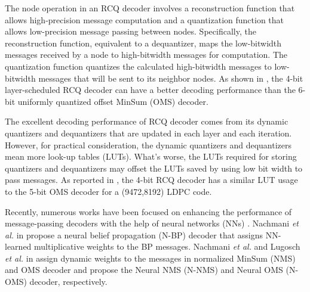 \documentclass [PhD] {uclathes}
\begin{document}
The node operation in an RCQ decoder involves a reconstruction function that allows high-precision message computation and a quantization function that allows low-precision message passing between nodes. Specifically, the reconstruction function, equivalent to a dequantizer,  maps the low-bitwidth messages received by a node to  high-bitwidth messages for computation. The quantization function quantizes the calculated high-bitwidth messages to low-bitwidth messages that will be sent to its neighbor nodes. 
 As shown in \cite{terrill2021fpga}, the 4-bit  layer-scheduled RCQ decoder can have a better decoding performance than the 6-bit uniformly quantized offset MinSum (OMS) decoder. 

 The excellent decoding performance of RCQ decoder comes from its dynamic quantizers and dequantizers that are updated in each layer and each iteration. However, for practical consideration, the dynamic quantizers and dequantizers mean more look-up tables (LUTs). What's worse, the LUTs required for storing quantizers and dequantizers may offset the LUTs saved by using low bit width to pass messages.  As reported in \cite{wang2022TCOMRCQ}, the 4-bit RCQ decoder has a similar LUT usage to the 5-bit OMS decoder for a (9472,8192) LDPC code. 

Recently, numerous works have been focused on enhancing the performance of message-passing decoders with the help of neural networks (NNs) \cite{Nachmani2016-bs,Lugosch2017-ed,Nachmani2017-qq,Nachmani2018-ra,Liang2018-lw,Wu2018-zr,Lugosch2018-gu,Lyu2018-nz,Xiao2019-kj,Deng2019-cf,Abotabl2019-wt,Buchberger2020-pf,Wang2020-fb,Lian2019-jh,nguyen2021neural}. 
Nachmani \textit{et al.} in \cite{Nachmani2016-bs} propose a  neural belief propagation (N-BP) decoder that assigns NN-learned multiplicative weights to the BP messages.
Nachmani \textit{et al.} and Lugosch \textit{et al.} in \cite{Nachmani2018-ra, Lugosch2017-ed,Nachmani2016-bs} assign dynamic weights to the messages in  normalized MinSum (NMS) and OMS decoder and propose the Neural NMS (N-NMS) and Neural OMS (N-OMS) decoder, respectively.
\end{document}
